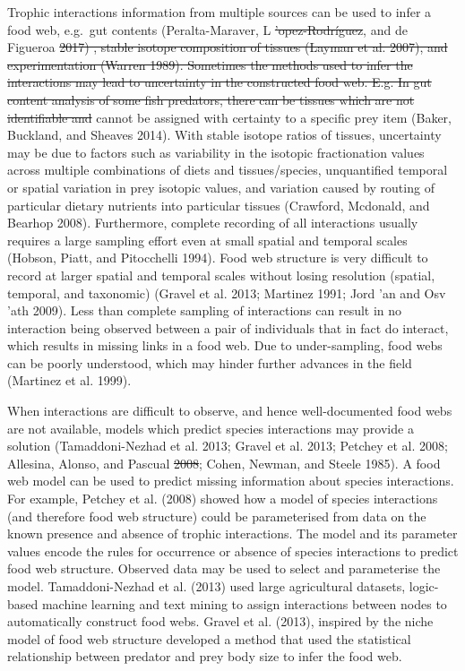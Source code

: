 \documentclass{article}
\providecommand{\DIFaddtex}[1]{{\protect\color{blue}\uwave{#1}}} %
\providecommand{\DIFdeltex}[1]{{\protect\color{red}\sout{#1}}}                      %
\providecommand{\DIFaddbegin}{} %
\providecommand{\DIFaddend}{} %
\providecommand{\DIFdelbegin}{} %
\providecommand{\DIFdelend}{} %
\providecommand{\DIFadd}[1]{\texorpdfstring{\DIFaddtex{#1}}{#1}} %
\providecommand{\DIFdel}[1]{\texorpdfstring{\DIFdeltex{#1}}{}} %
\newcommand{\DIFscaledelfig}{0.5}
\newlength{\DIFdelgraphicswidth} %
\newlength{\DIFdelgraphicsheight} %
\newcommand{\DIFaddincludegraphics}[2][]{{\color{blue}\fbox{\DIFOincludegraphics[#1]{#2}}}} %
\newcommand{\DIFdelincludegraphics}[2][]{%
\sbox{\DIFdelgraphicsbox}{\DIFOincludegraphics[#1]{#2}}%
\settoboxwidth{\DIFdelgraphicswidth}{\DIFdelgraphicsbox} %
\settoboxtotalheight{\DIFdelgraphicsheight}{\DIFdelgraphicsbox} %
\scalebox{\DIFscaledelfig}{%
\parbox[b]{\DIFdelgraphicswidth}{\usebox{\DIFdelgraphicsbox}\\[-\baselineskip] \rule{\DIFdelgraphicswidth}{0em}}\llap{\resizebox{\DIFdelgraphicswidth}{\DIFdelgraphicsheight}{%
\setlength{\unitlength}{\DIFdelgraphicswidth}%
\begin{picture}(1,1)%
\thicklines\linethickness{2pt} %
{\color[rgb]{1,0,0}\put(0,0){\framebox(1,1){}}}%
{\color[rgb]{1,0,0}\put(0,0){\line( 1,1){1}}}%
{\color[rgb]{1,0,0}\put(0,1){\line(1,-1){1}}}%
\end{picture}%
}\hspace*{3pt}}} %
} %
\DeclareRobustCommand{\DIFaddbegin}{\DIFOaddbegin \let\includegraphics\DIFaddincludegraphics} %
\DeclareRobustCommand{\DIFaddend}{\DIFOaddend \let\includegraphics\DIFOincludegraphics} %
\DeclareRobustCommand{\DIFdelbegin}{\DIFOdelbegin \let\includegraphics\DIFdelincludegraphics} %
\DeclareRobustCommand{\DIFdelend}{\DIFOaddend \let\includegraphics\DIFOincludegraphics} %
\begin{document}
Trophic interactions information from multiple sources can be used to
infer a food web, e.g.~gut contents (Peralta-Maraver, L\DIFdelbegin %
\DIFdel{'opez-Rodríguez}\DIFdelend \DIFaddbegin \DIFadd{'opez-Rodr'ıguez}\DIFaddend ,
and de Figueroa \DIFdelbegin \DIFdel{2017) , stable isotope composition of
tissues (Layman et al. 2007), and experimentation (Warren 1989).
Sometimes the methods used to infer the interactions may lead to
uncertainty in the constructed food web. E.g. In gut content analysis of
some fish predators, there can be tissues which are not identifiable and
}\DIFdelend \DIFaddbegin \DIFadd{2016) and }\DIFaddend cannot be assigned with certainty to a
specific prey item (Baker, Buckland, and Sheaves 2014). With stable
isotope ratios of tissues, uncertainty may be due to factors such as
variability in the isotopic fractionation values across multiple
combinations of diets and tissues/species, unquantified temporal or
spatial variation in prey isotopic values, and variation caused by
routing of particular dietary nutrients into particular tissues
(Crawford, Mcdonald, and Bearhop 2008). Furthermore, complete recording
of all interactions usually requires a large sampling effort even at
small spatial and temporal scales (Hobson, Piatt, and Pitocchelli 1994).
Food web structure is very difficult to record at larger spatial and
temporal scales without losing resolution (spatial, temporal, and
taxonomic) (Gravel et al. 2013; Martinez 1991; Jord\DIFdelbegin %
\DIFdelend 'an and Osv\DIFdelbegin %
\DIFdelend 'ath
2009). Less than complete sampling of interactions can result in no
interaction being observed between a pair of individuals that in fact do
interact, which results in missing links in a food web. Due to
under-sampling, food webs can be poorly understood, which may hinder
further advances in the field (Martinez et al. 1999).

When interactions are difficult to observe, and hence well-documented
food webs are not available, models which predict species interactions
may provide a solution (Tamaddoni-Nezhad et al. 2013; Gravel et al.
2013; \DIFaddbegin \DIFadd{Owen L. }\DIFaddend Petchey et al. 2008; Allesina, Alonso, and Pascual \DIFdelbegin \DIFdel{2008}\DIFdelend \DIFaddbegin \DIFadd{2008a}\DIFaddend ;
Cohen, Newman, and Steele 1985). A food web model can be used to predict
missing information about species interactions. For example, \DIFaddbegin \DIFadd{Owen L.
}\DIFaddend Petchey et al. (2008) showed how a model of species interactions (and
therefore food web structure) could be parameterised from data on the
known presence and absence of trophic interactions. The model and its
parameter values encode the rules for occurrence or absence of species
interactions to predict food web structure. Observed data may be used to
select and parameterise the model. Tamaddoni-Nezhad et al. (2013) used
large agricultural datasets, logic-based machine learning and text
mining to assign interactions between nodes to automatically construct
food webs. Gravel et al. (2013), inspired by the niche model of food web
structure developed a method that used the statistical relationship
between predator and prey body size to infer the food web.
\end{document}
